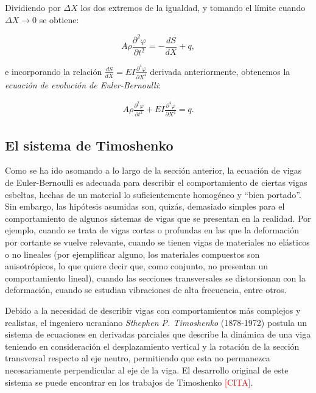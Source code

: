 Dividiendo por $\Delta X$ los dos extremos de la igualdad, y tomando el límite cuando $\Delta X \rightarrow 0$ se obtiene:

\[A \rho \frac{\partial^2 \varphi}{\partial t^2} = -\frac{dS}{dX} + q,\]

e incorporando la relación $\frac{dS}{dX} = EI \frac{\partial^4 \varphi}{\partial X^4}$ derivada anteriormente, obtenemos la \textit{ecuación de evolución de Euler-Bernoulli}:

\begin{align*}
    A \rho \frac{\partial^2 \varphi}{\partial t^2} + EI \frac{\partial^4 \varphi}{\partial X^4} = q.
\end{align*}

\subsection{El sistema de Timoshenko}
\label{ch:timoshenko:section:primerosmodelos:subsection:timoshenko}

Como se ha ido asomando a lo largo de la sección anterior, la ecuación de vigas de Euler-Bernoulli es adecuada para describir el comportamiento de ciertas vigas esbeltas, hechas de un material lo suficientemente homogéneo y ``bien portado''. Sin embargo, las hipótesis asumidas son, quizás, demasiado simples para el comportamiento de algunos sistemas de vigas que se presentan en la realidad. Por ejemplo, cuando se trata de vigas cortas o profundas en las que la deformación por cortante se vuelve relevante, cuando se tienen vigas de materiales no elásticos o no lineales (por ejemplificar alguno, los materiales compuestos son anisotrópicos, lo que quiere decir que, como conjunto, no presentan un comportamiento lineal), cuando las secciones transversales se distorsionan con la deformación, cuando se estudian vibraciones de alta frecuencia, entre otros. 

Debido a la necesidad de describir vigas con comportamientos más complejos y realistas, el ingeniero ucraniano \textit{Sthephen P. Timoshenko} (1878-1972) postula un sistema de ecuaciones en derivadas parciales que describe la dinámica de una viga teniendo en consideración el desplazamiento vertical y la rotación de la sección transversal respecto al eje neutro, permitiendo que esta no permanezca necesariamente perpendicular al eje de la viga. El desarrollo original de este sistema se puede encontrar en los trabajos de Timoshenko \textcolor{red}{[CITA]}.

